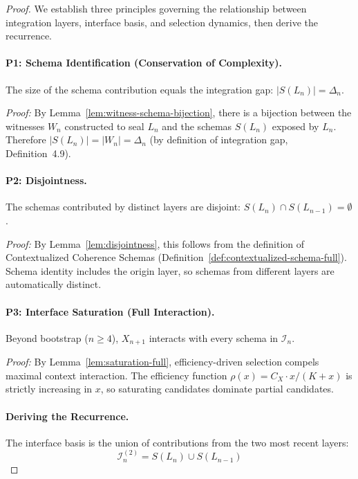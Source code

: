 \documentclass[11pt]{article}
\theoremstyle{definition}
\theoremstyle{remark}
\begin{document}
\begin{proof}
We establish three principles governing the relationship between integration layers, interface basis,
and selection dynamics, then derive the recurrence.

\paragraph{P1: Schema Identification (Conservation of Complexity).}

The size of the schema contribution equals the integration gap: $|S(L_n)| = \Delta_n$.

\emph{Proof:} By Lemma~\ref{lem:witness-schema-bijection}, there is a bijection between the
witnesses $W_n$ constructed to seal $L_n$ and the schemas $S(L_n)$ exposed by $L_n$. Therefore
$|S(L_n)| = |W_n| = \Delta_n$ (by definition of integration gap, Definition~4.9).

\paragraph{P2: Disjointness.}

The schemas contributed by distinct layers are disjoint: $S(L_n) \cap S(L_{n-1}) = \emptyset$.

\emph{Proof:} By Lemma~\ref{lem:disjointness}, this follows from the definition of Contextualized
Coherence Schemas (Definition~\ref{def:contextualized-schema-full}). Schema identity includes
the origin layer, so schemas from different layers are automatically distinct.

\paragraph{P3: Interface Saturation (Full Interaction).}

Beyond bootstrap ($n \geq 4$), $X_{n+1}$ interacts with every schema in $\mathcal{I}_n$.

\emph{Proof:} By Lemma~\ref{lem:saturation-full}, efficiency-driven selection compels maximal
context interaction. The efficiency function $\rho(x) = C_X \cdot x/(K+x)$ is strictly increasing in
$x$, so saturating candidates dominate partial candidates.

\paragraph{Deriving the Recurrence.}

The interface basis is the union of contributions from the two most recent layers:
\[
\mathcal{I}_n^{(2)} = S(L_n) \cup S(L_{n-1})
\]


\end{proof}
\end{document}
